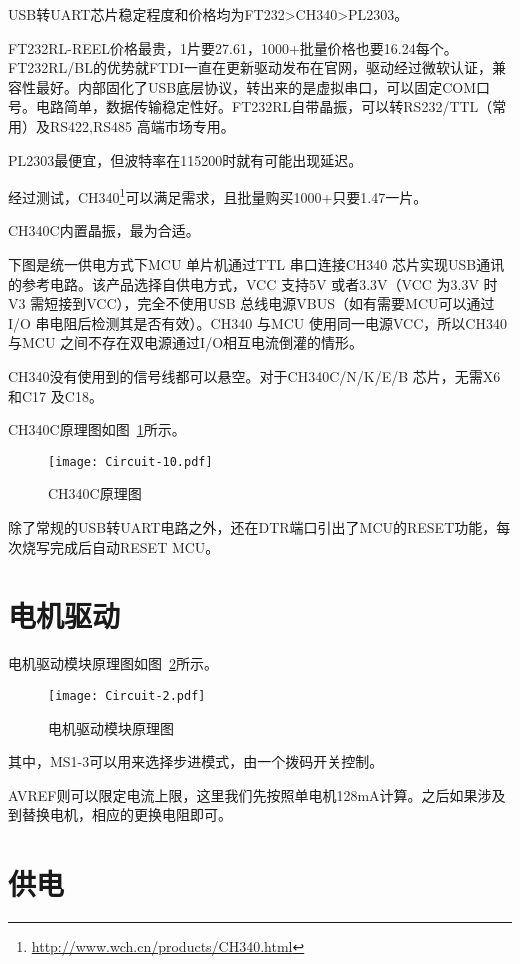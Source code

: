USB转UART芯片稳定程度和价格均为FT232>CH340>PL2303。

FT232RL-REEL价格最贵，1片要27.61，1000+批量价格也要16.24每个。FT232RL/BL的优势就FTDI一直在更新驱动发布在官网，驱动经过微软认证，兼容性最好。内部固化了USB底层协议，转出来的是虚拟串口，可以固定COM口号。电路简单，数据传输稳定性好。FT232RL自带晶振，可以转RS232/TTL（常用）及RS422,RS485 高端市场专用。

PL2303最便宜，但波特率在115200时就有可能出现延迟。

经过测试，CH340\footnote{\url{http://www.wch.cn/products/CH340.html}}可以满足需求，且批量购买1000+只要1.47一片。

CH340C内置晶振，最为合适。

下图是统一供电方式下MCU 单片机通过TTL 串口连接CH340 芯片实现USB通讯的参考电路。该产品选择自供电方式，VCC 支持5V 或者3.3V（VCC 为3.3V 时V3 需短接到VCC），完全不使用USB 总线电源VBUS（如有需要MCU可以通过I/O 串电阻后检测其是否有效）。CH340 与MCU 使用同一电源VCC，所以CH340与MCU 之间不存在双电源通过I/O相互电流倒灌的情形。

CH340没有使用到的信号线都可以悬空。对于CH340C/N/K/E/B 芯片，无需X6 和C17 及C18。

CH340C原理图如图~\ref{fig:Circuit-10}所示。

\begin{figure}[htbp]
    \centering
    \texttt{[image: Circuit-10.pdf]}
    \caption{CH340C原理图}
    \label{fig:Circuit-10}
\end{figure}

除了常规的USB转UART电路之外，还在DTR端口引出了MCU的RESET功能，每次烧写完成后自动RESET MCU。

\section{电机驱动}

电机驱动模块原理图如图~\ref{fig:Circuit-2}所示。

\begin{figure}[htbp]
    \centering
    \texttt{[image: Circuit-2.pdf]}
    \caption{电机驱动模块原理图}
    \label{fig:Circuit-2}
\end{figure}

其中，MS1-3可以用来选择步进模式，由一个拨码开关控制。

AVREF则可以限定电流上限，这里我们先按照单电机128mA计算。之后如果涉及到替换电机，相应的更换电阻即可。

\section{供电}

